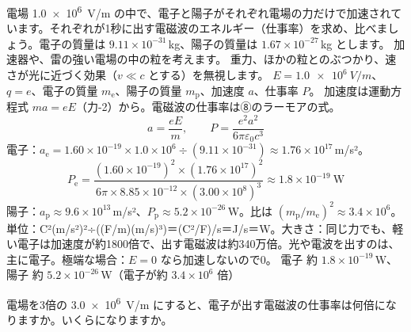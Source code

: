 \begin{phreidai}[電子と陽子が出す電磁波]
\label{ph:電-15:ex6}電場 \qty{1.0e6}{V/m} の中で、電子と陽子がそれぞれ電場の力だけで加速されています。それぞれが1秒に出す電磁波のエネルギー（仕事率）を求め、比べましょう。電子の質量は $9.11\times10^{-31}$\,kg、陽子の質量は $1.67\times10^{-27}$\,kg とします。
\phbamen
加速器や、雷の強い電場の中の粒を考えます。
\phmushi
重力、ほかの粒とのぶつかり、速さが光に近づく効果（$v\ll c$ とする）を無視します。
\phzu
$E=\qty{1.0e6}{V/m}$、$q=e$、電子の質量 $m_{\mathrm e}$、陽子の質量 $m_{\mathrm p}$、加速度 $a$、仕事率 $P$。
\phriyu
加速度は運動方程式 $ma=eE$（力-2）から。電磁波の仕事率は⑧のラーモアの式。
\phtateru
\[ a=\frac{eE}{m},\qquad P=\frac{e^2a^2}{6\pi\varepsilon_0c^3} \]
\phtoku
電子：$a_{\mathrm e}=1.60\times10^{-19}\times1.0\times10^6\div(9.11\times10^{-31})\approx1.76\times10^{17}$\,m/s²。
\[ P_{\mathrm e}=\frac{(1.60\times10^{-19})^2\times(1.76\times10^{17})^2}{6\pi\times8.85\times10^{-12}\times(3.00\times10^8)^3}\approx1.8\times10^{-19}\ \mathrm{W} \]
陽子：$a_{\mathrm p}\approx9.6\times10^{13}$\,m/s²、$P_{\mathrm p}\approx5.2\times10^{-26}$\,W。比は $(m_{\mathrm p}/m_{\mathrm e})^2\approx3.4\times10^6$。
\phtashikame
単位：C²(m/s²)²÷((F/m)(m/s)³)＝(C²/F)/s＝J/s＝W。大きさ：同じ力でも、軽い電子は加速度が約1800倍で、出す電磁波は約340万倍。光や電波を出すのは、主に電子。極端な場合：$E=0$ なら加速しないので0。
\kotae 電子 約 $1.8\times10^{-19}$\,W、陽子 約 $5.2\times10^{-26}$\,W（電子が約 $3.4\times10^6$ 倍）
\end{phreidai}
\begin{jibun}
電場を3倍の \qty{3.0e6}{V/m} にすると、電子が出す電磁波の仕事率は何倍になりますか。いくらになりますか。
\end{jibun}

